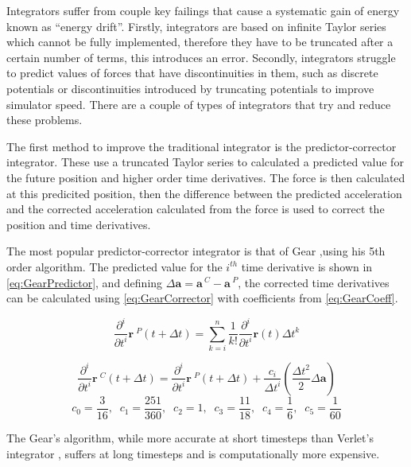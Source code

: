 \documentclass[12pt]{UoAthesis}
\begin{document}
Integrators suffer from couple key failings that cause a systematic
gain of energy known as ``energy drift''. Firstly, integrators are
based on infinite Taylor series which cannot be fully implemented,
therefore they have to be truncated after a certain number of terms,
this introduces an error. Secondly, integrators struggle to predict
values of forces that have discontinuities in them, such as discrete
potentials or discontinuities introduced by truncating potentials to
improve simulator speed.  There are a couple of types of integrators
that try and reduce these problems.

The first method to improve the traditional integrator is the
predictor-corrector integrator. These use a truncated Taylor series
to calculated a predicted value for the future position and higher
order time derivatives. The force is then calculated at this
predicited position, then the difference between the predicted
acceleration and the corrected acceleration calculated from the force
is used to correct the position and time derivatives.

The most popular predictor-corrector integrator is that of Gear
\cite{Gear1971},using his 5th order algorithm. The predicted value for
the $i^{th}$ time derivative is shown in \eqref{eq:GearPredictor}, and
defining $\Delta \mathbf{a} = \mathbf{a}\,^{C} - \mathbf{a}\,^{P}$, the
corrected time derivatives can be calculated using
\eqref{eq:GearCorrector} with coefficients from \eqref{eq:GearCoeff}.

\begin{equation} 
  \frac{\partial^{i}}{\partial t^{i}} \mathbf{r}\:^{P}(t+\Delta t)
  =\sum^{n}_{k=i} \frac{1}{k!}\frac{\partial^{i} }{\partial t^{i}}
  \mathbf{r}(t) \Delta t^{k} 
  \label{eq:GearPredictor} 
\end{equation}

\begin{equation} 
  \frac{\partial^{i}}{\partial t^{i}} \mathbf{r}\:^{C}(t+\Delta t)
  =\frac{\partial^{i} }{\partial t^{i}} \mathbf{r}\:^{P}(t+\Delta t)
  +\frac{c_i}{\Delta t^i} \left(\frac{\Delta t^2}{2}\Delta \mathbf{a}\right)
  \label{eq:GearCorrector} \end{equation} \begin{equation} c_0 =
  \frac{3}{16},\;\;c_1 = \frac{251}{360},\;\; c_2 = 1,\;\; c_3 =
  \frac{11}{18},\;\; c_4 =
  \frac{1}{6},\;\; c_5 = \frac{1}{60} \label{eq:GearCoeff} 
\end{equation}

The Gear's algorithm, while more accurate at short timesteps than Verlet's
integrator \cite{Haile1997}, suffers at long timesteps and is computationally
more expensive.
\end{document}
